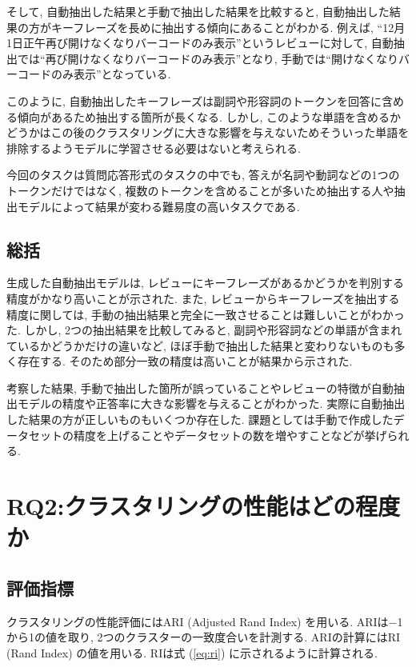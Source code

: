 そして, 自動抽出した結果と手動で抽出した結果を比較すると, 自動抽出した結果の方がキーフレーズを長めに抽出する傾向にあることがわかる. 
例えば, ``12月1日正午再び開けなくなりバーコードのみ表示''というレビューに対して, 自動抽出では``再び開けなくなりバーコードのみ表示''となり, 手動では``開けなくなりバーコードのみ表示''となっている. 

このように, 自動抽出したキーフレーズは副詞や形容詞のトークンを回答に含める傾向があるため抽出する箇所が長くなる. しかし, このような単語を含めるかどうかはこの後のクラスタリングに大きな影響を与えないためそういった単語を排除するようモデルに学習させる必要はないと考えられる. 

今回のタスクは質問応答形式のタスクの中でも, 答えが名詞や動詞などの1つのトークンだけではなく, 複数のトークンを含めることが多いため抽出する人や抽出モデルによって結果が変わる難易度の高いタスクである. 


\subsection{総括}
生成した自動抽出モデルは, レビューにキーフレーズがあるかどうかを判別する精度がかなり高いことが示された. 
また, レビューからキーフレーズを抽出する精度に関しては, 手動の抽出結果と完全に一致させることは難しいことがわかった. しかし, 2つの抽出結果を比較してみると, 副詞や形容詞などの単語が含まれているかどうかだけの違いなど, ほぼ手動で抽出した結果と変わりないものも多く存在する. そのため部分一致の精度は高いことが結果から示された. 

考察した結果, 手動で抽出した箇所が誤っていることやレビューの特徴が自動抽出モデルの精度や正答率に大きな影響を与えることがわかった. 実際に自動抽出した結果の方が正しいものもいくつか存在した. 課題としては手動で作成したデータセットの精度を上げることやデータセットの数を増やすことなどが挙げられる. 


\section{RQ2:クラスタリングの性能はどの程度か}
\subsection{評価指標}
クラスタリングの性能評価にはARI (Adjusted Rand Index) を用いる. ARIは$-$1から1の値を取り, 2つのクラスターの一致度合いを計測する. 
ARIの計算にはRI (Rand Index) の値を用いる. RIは式 (\ref{eq:ri}) に示されるように計算される. 

